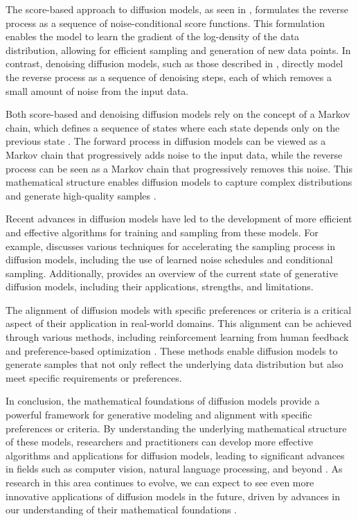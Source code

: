 \documentclass[11pt,a4paper]{article}
\begin{document}
The score-based approach to diffusion models, as seen in \cite{arxiv:2208.11970}, formulates the reverse process as a sequence of noise-conditional score functions. This formulation enables the model to learn the gradient of the log-density of the data distribution, allowing for efficient sampling and generation of new data points. In contrast, denoising diffusion models, such as those described in \cite{arxiv:2303.07576}, directly model the reverse process as a sequence of denoising steps, each of which removes a small amount of noise from the input data. 

Both score-based and denoising diffusion models rely on the concept of a Markov chain, which defines a sequence of states where each state depends only on the previous state \cite{doi:10.5121/ijfcst.2015.5501}. The forward process in diffusion models can be viewed as a Markov chain that progressively adds noise to the input data, while the reverse process can be seen as a Markov chain that progressively removes this noise. This mathematical structure enables diffusion models to capture complex distributions and generate high-quality samples \cite{arxiv:2402.16369}. 

Recent advances in diffusion models have led to the development of more efficient and effective algorithms for training and sampling from these models. For example, \cite{arxiv:2210.09292} discusses various techniques for accelerating the sampling process in diffusion models, including the use of learned noise schedules and conditional sampling. Additionally, \cite{doi:10.1109/tkde.2024.3361474} provides an overview of the current state of generative diffusion models, including their applications, strengths, and limitations. 

The alignment of diffusion models with specific preferences or criteria is a critical aspect of their application in real-world domains. This alignment can be achieved through various methods, including reinforcement learning from human feedback \cite{arxiv:2305.13301} and preference-based optimization \cite{arxiv:2601.04300}. These methods enable diffusion models to generate samples that not only reflect the underlying data distribution but also meet specific requirements or preferences. 

In conclusion, the mathematical foundations of diffusion models provide a powerful framework for generative modeling and alignment with specific preferences or criteria. By understanding the underlying mathematical structure of these models, researchers and practitioners can develop more effective algorithms and applications for diffusion models, leading to significant advances in fields such as computer vision, natural language processing, and beyond \cite{doi:10.1111/cgf.15063}. As research in this area continues to evolve, we can expect to see even more innovative applications of diffusion models in the future, driven by advances in our understanding of their mathematical foundations \cite{doi:10.1109/tpami.2025.3545047}.
\end{document}
